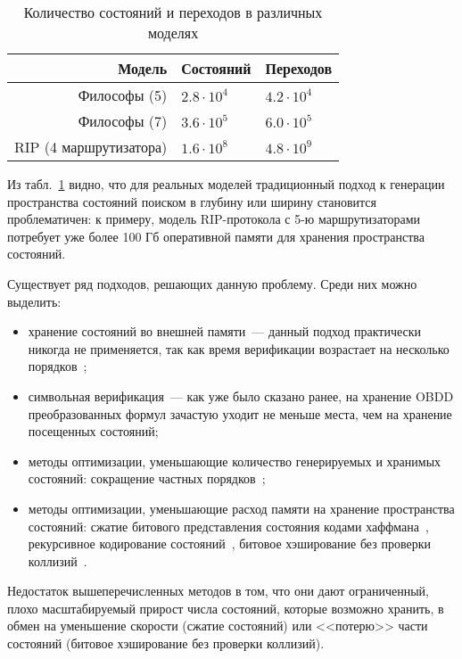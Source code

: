 \documentclass[a4paper,notitlepage,14pt]{article}
\begin{document}
\begin{table}
  \centering
  \begin{tabular}{|r|l|l|}
    \hline
    Модель                  & Состояний         & Переходов       \\
    \hline
    Философы (5)            & $2.8 \cdot 10^4$  & $4.2 \cdot 10^4$ \\
    Философы (7)            & $3.6 \cdot 10^5$  & $6.0 \cdot 10^5$ \\
    RIP (4 маршрутизатора)  & $1.6 \cdot 10^8$  & $4.8 \cdot 10^9$ \\
    \hline
  \end{tabular}
  \caption{Количество состояний и переходов в различных моделях}
\label{tab:models-statecount}
\end{table}

Из табл.~\ref{tab:models-statecount} видно, что для реальных моделей традиционный подход к
генерации пространства состояний поиском в глубину или ширину становится проблематичен: к
примеру, модель RIP-протокола с 5-ю маршрутизаторами потребует уже более 100 Гб
оперативной памяти для хранения пространства состояний.

Существует ряд подходов, решающих данную проблему. Среди них можно выделить:

\begin{itemize}
\item хранение состояний во внешней памяти~--- данный подход практически никогда не
  применяется, так как время верификации возрастает на несколько порядков~\cite{Clarke};
\item символьная верификация~--- как уже было сказано ранее, на хранение OBDD
  преобразованных формул зачастую уходит не меньше места, чем на хранение посещенных
  состояний;
\item методы оптимизации, уменьшающие количество генерируемых и хранимых состояний:
  сокращение частных порядков~\cite{POD};
\item методы оптимизации, уменьшающие расход памяти на хранение пространства состояний:
  сжатие битового представления состояния кодами хаффмана~\cite{StateCompr}, рекурсивное
  кодирование состояний~\cite{StateCompr}, битовое хэширование без проверки
  коллизий~\cite{BitHash1,Wolper}.
\end{itemize}

Недостаток вышеперечисленных методов в том, что они дают ограниченный, плохо
масштабируемый прирост числа состояний, которые возможно хранить, в обмен на уменьшение
скорости (сжатие состояний) или <<потерю>> части состояний (битовое хэширование без
проверки коллизий).
\end{document}
